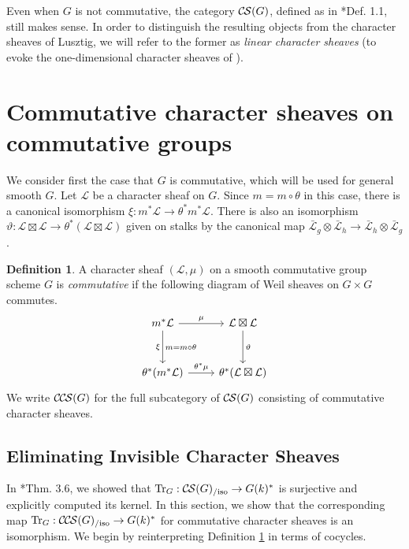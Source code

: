 \documentclass[10pt]{amsart}
\theoremstyle{plain}
\theoremstyle{definition}
\newtheorem{definition}[theorem]{Definition}
\newcommand{\TrFrob}[1]{\operatorname{Tr}_{#1}}
\newcommand{\cs}[1]{{\mathcal{#1}}}
\newcommand{\gcs}[1]{{\mathcal{\bar #1}}}
\newcommand{\CS}{{\mathcal{C\hskip-0.8pt S}}}
\newcommand{\CCS}{{\mathcal{C\hskip-.8pt C\hskip-0.8pt S}}}
\newcommand{\CSiso}[1]{\CS(#1)_{/\text{iso}}}
\newcommand{\CCSiso}[1]{\CCS(#1)_{/\text{iso}}}
\begin{document}
Even when $G$ is not commutative, the category $\CS(G)$, defined as in \cite{cunningham-roe:13a}*{Def. 1.1},
still makes sense.  In order to distinguish the resulting objects from
the character sheaves of Lusztig, we will refer to the former as \emph{linear character sheaves}
(to evoke the one-dimensional character sheaves of \cite{kamgarpour:09a}).

\section{Commutative character sheaves on commutative groups}\label{sec:comcom}

We consider first the case that $G$ is commutative, which will be used for general smooth $G$.
Let $\cs{L}$ be a character sheaf on $G$.  Since $m = m \circ \theta$ in this case,
there is a canonical isomorphism $\xi : m^* \cs{L} \to \theta^* m^* \cs{L}$.
There is also an isomorphism $\vartheta : \cs{L}\boxtimes\cs{L} \to \theta^*(\cs{L}\boxtimes\cs{L})$
given on stalks by the canonical map $\gcs{L}_{g} \otimes \gcs{L}_{h} \to \gcs{L}_{h} \otimes \gcs{L}_{g}$.

\begin{definition}\label{def:CCScom}
A character sheaf $(\cs{L}, \mu)$ on a smooth commutative group scheme $G$ is \emph{commutative}
if the following diagram of Weil sheaves on $G \times G$ commutes.
  \[
  \begin{tikzcd}[row sep=30]
   m^*\cs{L} \arrow{d}[swap]{\xi}{m= m\circ\theta} \arrow{r}{\mu} & \cs{L}\boxtimes\cs{L} \arrow{d}{\vartheta}\\
   \theta^*(m^*\cs{L}) \arrow{r}{{\theta}^*\mu} &  \theta^*(\cs{L}\boxtimes\cs{L})
  \end{tikzcd}
  \]
We write $\CCS(G)$ for the full subcategory of $\CS(G)$ consisting of commutative character sheaves.
 \end{definition}

\subsection{Eliminating Invisible Character Sheaves}\label{ssec:defect}

In \cite{cunningham-roe:13a}*{Thm. 3.6}, we showed that $\TrFrob{G} : \CSiso{G} \to G(k)^*$ is surjective and
explicitly computed its kernel.  In this section, we show that the corresponding map
$\TrFrob{G} : \CCSiso{G} \to G(k)^*$ for commutative character sheaves is an isomorphism.
We begin by reinterpreting Definition \ref{def:CCScom} in terms of cocycles.
\end{document}

